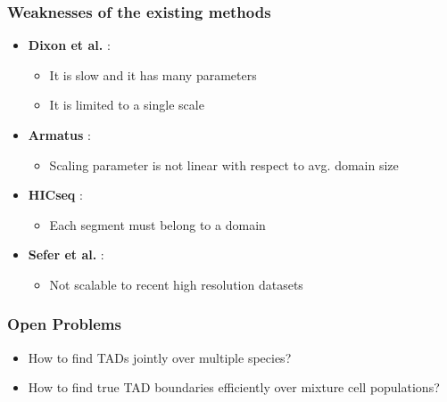 \documentclass[12pt]{beamer}
\begin{document}
\begin{frame}
\frametitle{Weaknesses of the existing methods}

\begin{itemize}
\item \textbf{Dixon et al.} : 
\begin{itemize}
\item It is slow and it has many parameters 
\vspace{0.05cm}
\item It is limited to a single scale
\end{itemize}
\vspace{0.1cm}
\item \textbf{Armatus} :
\begin{itemize}
\item Scaling parameter is not linear with respect to avg. domain size
\end{itemize}
\vspace{0.1cm}
\item \textbf{HICseq} :
\begin{itemize}
\item Each segment must belong to a domain
\end{itemize}
\vspace{0.1cm}
\item \textbf{Sefer et al.} :
\begin{itemize}
\item Not scalable to recent high resolution datasets
\end{itemize}
\end{itemize}

\end{frame}






\begin{frame}
\frametitle{Open Problems}

\begin{itemize}
\item How to find TADs jointly over multiple species?
\vspace{0.1cm}
\item How to find true TAD boundaries efficiently over mixture cell populations?
\end{itemize}

\end{frame}
\end{document}
